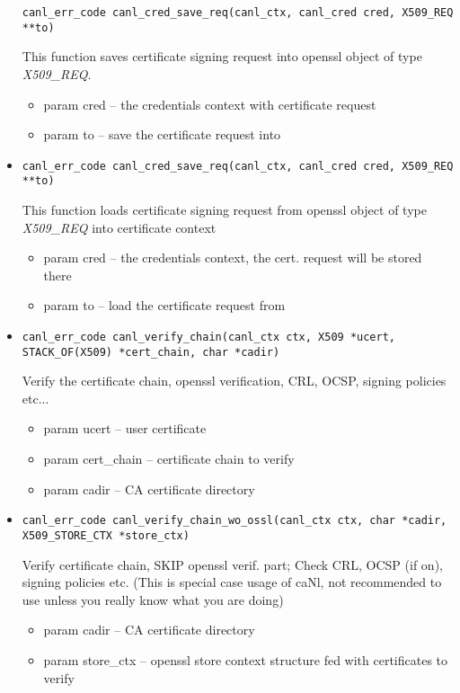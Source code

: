 \begin{itemize}
\begin{verbatim}
canl_err_code canl_cred_save_req(canl_ctx, canl_cred cred, X509_REQ **to)\end{verbatim}
  This function saves certificate signing request into openssl 
  object of type \textit{X509\_REQ}.
  \begin{itemize}
    \item param cred -- the credentials context with certificate request
    \item param to -- save the certificate request into
  \end{itemize}
  \item \begin{verbatim}
canl_err_code canl_cred_save_req(canl_ctx, canl_cred cred, X509_REQ **to)\end{verbatim}
  This function loads certificate signing request from openssl object of type \textit{X509\_REQ} into \CANL certificate context
  \begin{itemize}
    \item param cred -- the credentials context, the cert. request
  will be stored there
    \item param to -- load the certificate request from
  \end{itemize}

  \item \begin{verbatim}
canl_err_code canl_verify_chain(canl_ctx ctx, X509 *ucert, STACK_OF(X509) *cert_chain, char *cadir)\end{verbatim}
  Verify the certificate chain, openssl verification, CRL, OCSP, 
  signing policies etc...
  \begin{itemize}
    \item param ucert -- user certificate
    \item param cert\_chain  -- certificate chain to verify
    \item param cadir  -- CA certificate directory
  \end{itemize}

  \item \begin{verbatim}
canl_err_code canl_verify_chain_wo_ossl(canl_ctx ctx, char *cadir, X509_STORE_CTX *store_ctx)\end{verbatim}
  Verify certificate chain, SKIP openssl verif. part; Check CRL, OCSP (if on), 
  signing policies etc. (This is special case usage of caNl, not recommended to use unless you really know what you are doing)
  \begin{itemize}
    \item param cadir  -- CA certificate directory
    \item param store\_ctx -- openssl store context structure fed with certificates to verify
  \end{itemize}

\end{itemize}

